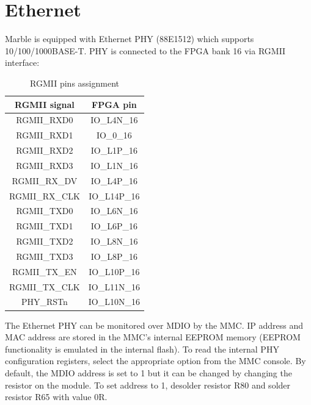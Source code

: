 \documentclass[12pt,oneside,a4]{article}
\begin{document}
\section{Ethernet}
Marble is equipped with Ethernet PHY (88E1512) which supports 10/100/1000BASE-T. PHY is connected to the FPGA bank 16 via RGMII interface:

\begin{table}[htbp]
\centering
\begin{tabular}{@{}cc@{}}
\toprule
\textbf{RGMII signal}              & \textbf{FPGA pin}                \\ \midrule
RGMII\_RXD0                        & IO\_L4N\_16                      \\
RGMII\_RXD1                        & IO\_0\_16                        \\
RGMII\_RXD2                        & IO\_L1P\_16                      \\
RGMII\_RXD3                        & IO\_L1N\_16                      \\
RGMII\_RX\_DV                      & IO\_L4P\_16                      \\
RGMII\_RX\_CLK                     & IO\_L14P\_16                     \\
RGMII\_TXD0                        & IO\_L6N\_16                      \\
RGMII\_TXD1                        & IO\_L6P\_16                      \\
RGMII\_TXD2                        & IO\_L8N\_16                      \\
RGMII\_TXD3                        & IO\_L8P\_16                      \\
RGMII\_TX\_EN                      & IO\_L10P\_16                     \\
\multicolumn{1}{l}{RGMII\_TX\_CLK} & \multicolumn{1}{l}{IO\_L11N\_16} \\
PHY\_RSTn                          & IO\_L10N\_16                     \\ \bottomrule
\end{tabular}
\caption{RGMII pins assignment}
\label{tab:rgmii}
\end{table}
The Ethernet PHY can be monitored over MDIO by the MMC. IP address and MAC address are stored in the MMC's internal EEPROM memory (EEPROM functionality is emulated in the internal flash). To read the internal PHY configuration registers, select the appropriate option from the MMC console.
By default, the MDIO address is set to 1 but it can be changed by changing the resistor on the module. To set address to 1, desolder resistor R80 and solder resistor R65 with value 0R.
\end{document}
